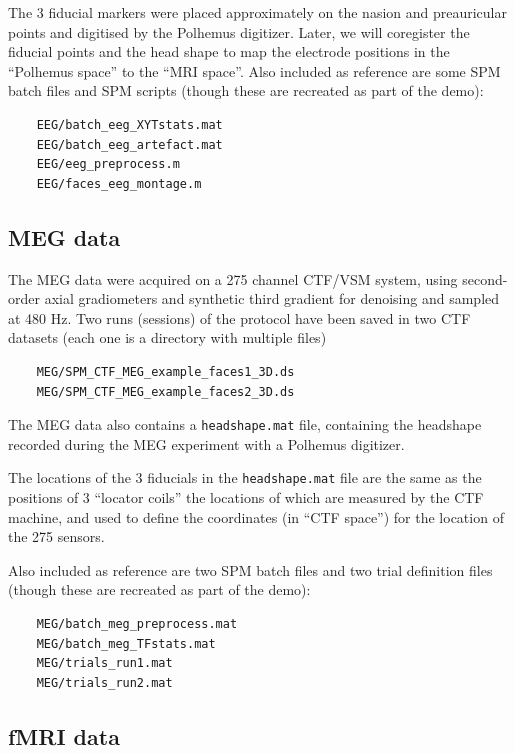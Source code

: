 The 3 fiducial markers were placed approximately on the nasion and preauricular points and digitised by the Polhemus digitizer.  Later, we will coregister the fiducial points and the head shape to map the electrode positions in the ``Polhemus space'' to the ``MRI space''.
Also included as reference are some SPM batch files and SPM scripts (though these are recreated as part of the demo):

\begin{verbatim}
    EEG/batch_eeg_XYTstats.mat
    EEG/batch_eeg_artefact.mat
    EEG/eeg_preprocess.m
    EEG/faces_eeg_montage.m
\end{verbatim}


\subsection{MEG data \label{multimodal:data:meg}}

The MEG data were acquired on a 275 channel CTF/VSM system, using second-order axial gradiometers and synthetic third gradient for denoising and sampled at 480 Hz. Two runs (sessions) of the protocol have been saved in two CTF datasets (each one is a directory with multiple files) 
\begin{verbatim}
    MEG/SPM_CTF_MEG_example_faces1_3D.ds
    MEG/SPM_CTF_MEG_example_faces2_3D.ds
\end{verbatim}
The MEG data also contains a \texttt{headshape.mat} file, containing the headshape recorded during the MEG experiment with a Polhemus digitizer.

The locations of the 3 fiducials in the \texttt{headshape.mat} file are the same as the positions of 3 ``locator coils'' the locations of which are measured by the CTF machine, and used to define the coordinates (in ``CTF space'') for the location of the 275 sensors.

Also included as reference are two SPM batch files and two trial definition files (though these are recreated as part of the demo):
\begin{verbatim}
    MEG/batch_meg_preprocess.mat
    MEG/batch_meg_TFstats.mat
    MEG/trials_run1.mat
    MEG/trials_run2.mat
\end{verbatim}

\subsection{fMRI data}

